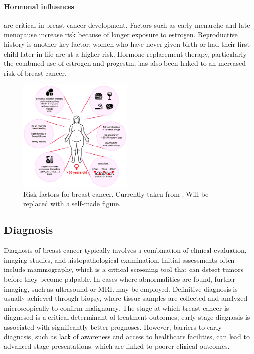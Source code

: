 \paragraph{Hormonal influences} are critical in breast cancer development.
Factors such as early menarche and late menopause increase risk because of
longer exposure to estrogen\supercite{nounu_sex_2022}.
Reproductive history is another key factor: women who have never given birth or
had their first child later in life are at a higher
risk\supercite{claudia_admoun_etiology_2022}.
Hormone replacement therapy, particularly the combined use of estrogen and
progestin, has also been linked to an increased risk of breast
cancer\supercite{turner_meta-analysis_2011}.

\begin{figure}[ht]
    \centering

    \includegraphics[width=0.5\textwidth]{chapters/2_background/figures/risk-factors.png}
    \caption{Risk factors for breast cancer.
        Currently taken from \cite{clusan_basic_2023}.
        Will be replaced with a self-made figure.
    }
    \label{fig:brca_risk-factors}
\end{figure}

\subsection{Diagnosis}
\label{sec:brca_diagnosis}

Diagnosis of breast cancer typically involves a combination of clinical
evaluation, imaging studies, and histopathological examination.
Initial assessments often include mammography, which is a critical screening
tool that can detect tumors before they become
palpable\supercite{hameed_breast_2020}.
In cases where abnormalities are found, further imaging, such as ultrasound or
MRI, may be employed.
Definitive diagnosis is usually achieved through biopsy, where tissue samples
are collected and analyzed microscopically to confirm
malignancy\supercite{hameed_breast_2020}.
The stage at which breast cancer is diagnosed is a critical determinant of
treatment outcomes; early-stage diagnosis is associated with significantly
better prognoses\supercite{getachew_perceived_2020}.
However, barriers to early diagnosis, such as lack of awareness and access to
healthcare facilities, can lead to advanced-stage presentations, which are
linked to poorer clinical
outcomes\supercite{getachew_perceived_2020,dickens_stage_2014}.

